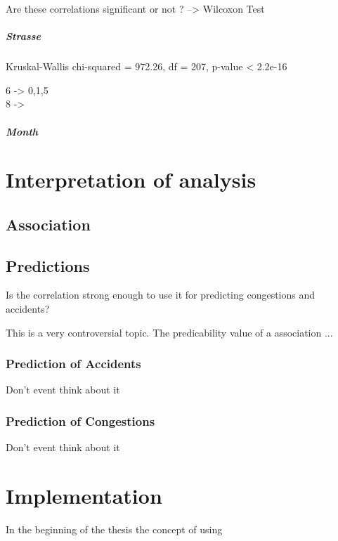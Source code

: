 \documentclass[a4paper,headsepline,footsepline,fontsize=11pt,BCOR=12mm,DIV=12]{report}
\begin{document}
Are these correlations significant or not ? --> Wilcoxon Test

\paragraph{Strasse}

Kruskal-Wallis chi-squared = 972.26, df = 207, p-value < 2.2e-16

6 -> 0,1,5 \\
8 -> 

\paragraph{Month}



\chapter{Interpretation of analysis}



\section{Association}



\section{Predictions}
Is the correlation strong enough to use it for predicting congestions and accidents?

This is a very controversial topic. The predicability value of a association ...



\subsection{Prediction of Accidents}
Don't event think about it



\subsection{Prediction of Congestions}
Don't event think about it



\chapter{Implementation}
In the beginning of the thesis the concept of using 
\end{document}
